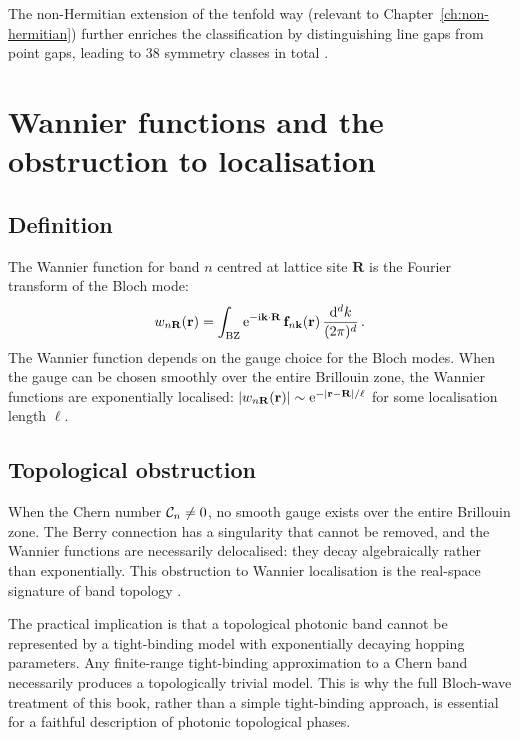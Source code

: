 The non-Hermitian extension of the tenfold way (relevant to
Chapter~\ref{ch:non-hermitian}) further enriches the classification
by distinguishing line gaps from point gaps, leading to 38 symmetry
classes in total \cite{price2022roadmap} \cite{shen2017topological}.

\section{Wannier functions and the obstruction to localisation}
\label{sec:appB-wannier}

\subsection{Definition}
\label{sec:appB-wannier-def}

The Wannier function for band $n$ centred at lattice site
$\mathbf{R}$ is the Fourier transform of the Bloch mode:
\begin{equation}\label{eq:appB-wannier}
  w_{n\mathbf{R}}(\mathbf{r})
  = \int_{\mathrm{BZ}}\mathrm{e}^{-\mathrm{i}\mathbf{k}\cdot\mathbf{R}}\,
  \mathbf{f}_{n\mathbf{k}}(\mathbf{r})\,\frac{\mathrm{d}^d k}{(2\pi)^d}\,.
\end{equation}
The Wannier function depends on the gauge choice for the Bloch modes.
When the gauge can be chosen smoothly over the entire Brillouin zone,
the Wannier functions are exponentially localised: $|w_{n\mathbf{R}}
(\mathbf{r})|\sim\mathrm{e}^{-|\mathbf{r}-\mathbf{R}|/\ell}$ for some localisation
length $\ell$.

\subsection{Topological obstruction}
\label{sec:appB-wannier-obstruction}

When the Chern number $\mathcal{C}_n\neq 0$, no smooth gauge exists over
the entire Brillouin zone.  The Berry connection has a singularity
that cannot be removed, and the Wannier functions are necessarily
delocalised: they decay algebraically rather than exponentially.
This obstruction to Wannier localisation is the real-space signature
of band topology \cite{ozawa2018topological,gangaraj2016berry}.

The practical implication is that a topological photonic band cannot be
represented by a tight-binding model with exponentially decaying
hopping parameters.  Any finite-range tight-binding approximation
to a Chern band necessarily produces a topologically trivial model.
This is why the full Bloch-wave treatment of this book, rather than
a simple tight-binding approach, is essential for a faithful
description of photonic topological phases.

